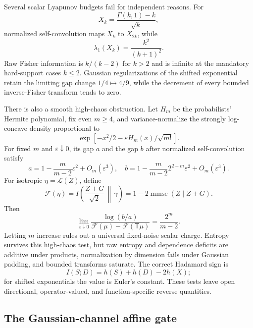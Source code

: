 \documentclass[11pt]{article}
\theoremstyle{definition}
\theoremstyle{remark}
\newcommand{\1}{\mathbf 1}
\begin{document}
Several scalar Lyapunov budgets fail for independent reasons.  For
\[
 X_k=\frac{\Gamma(k,1)-k}{\sqrt k},
\]
normalized self-convolution maps \(X_k\) to \(X_{2k}\), while
\[
                         \lambda_1(X_k)=\frac{k^2}{(k+1)^2}. \tag{10.7}
\]
Raw Fisher information is \(k/(k-2)\) for \(k>2\) and is infinite at the
mandatory hard-support cases \(k\le2\).  Gaussian regularizations of the
shifted exponential retain the limiting gap change
\(1/4\mapsto4/9\), while the decrement of every bounded inverse-Fisher
transform tends to zero.

There is also a smooth high-chaos obstruction.  Let \(H_m\) be the
probabilists' Hermite polynomial, fix even \(m\ge4\), and
variance-normalize the strongly log-concave density proportional to
\[
 \exp[-x^2/2-\varepsilon H_m(x)/\sqrt{m!}].
\]
For fixed \(m\) and \(\varepsilon\downarrow0\), its gap \(a\) and the gap
\(b\) after normalized self-convolution satisfy
\[
 a=1-\frac{m}{m-2}\varepsilon^2+O_m(\varepsilon^3),
 \quad
 b=1-\frac{m}{m-2}2^{2-m}\varepsilon^2
        +O_m(\varepsilon^3).                         \tag{10.8}
\]
For isotropic \(\eta=\mathcal L(Z)\), define
\[
 \mathcal F(\eta)
 =I\left(\frac{Z+G}{\sqrt2}\,\middle\|\,\gamma\right)
 =1-2\operatorname{mmse}(Z\mid Z+G).
\]
Then
\[
 \lim_{\varepsilon\downarrow0}
 \frac{\log(b/a)}
 {\mathcal F(\mu)-\mathcal F(\mathsf T\mu)}
 =\frac{2^m}{m-2}.                                   \tag{10.9}
\]
Letting \(m\) increase rules out a universal fixed-noise scalar charge.
Entropy survives this high-chaos test, but raw entropy and dependence
deficits are additive under products, normalization by dimension fails
under Gaussian padding, and bounded transforms saturate.  The correct
Hadamard sign is
\[
                         I(S;D)=h(S)+h(D)-2h(X);
\]
for shifted exponentials the value is Euler's constant.  These tests leave
open directional, operator-valued, and function-specific reverse
quantities.

\subsection{The Gaussian-channel affine gate}
\end{document}
